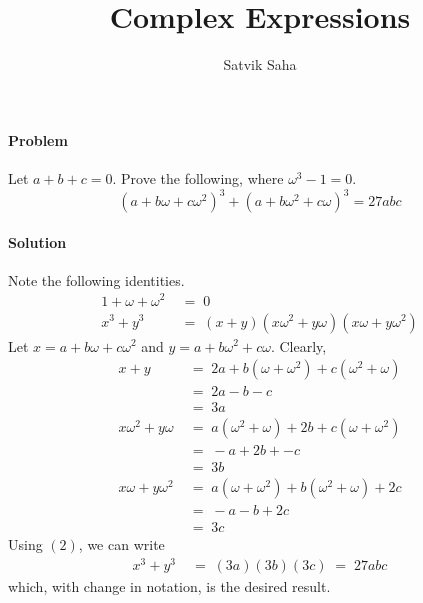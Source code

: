 \documentclass[a4paper, 11pt, reqno]{article}
\title{Complex Expressions}
\author{Satvik Saha}
\date{}
\begin{document}
	\maketitle
	\paragraph{Problem}
	Let $a + b + c = 0$. Prove the following, where $\omega^3 - 1 = 0$.
	\begin{equation*}
		(a + b\omega + c\omega ^2)^3 + (a + b\omega ^2 + c\omega)^3 = 27abc
	\end{equation*}
	\paragraph{Solution}
	Note the following identities.
	\begin{align}
		1 + \omega + \omega ^2  \; &= \; 0 	\\ 
		x^3 + y^3  \; &= \;  (x + y)(x\omega^2 + y\omega)(x\omega + y\omega^2) 
	\end{align}
	Let $x  =  a + b\omega + c\omega ^2$ and $y  =  a + b\omega ^2 + c\omega$.
	Clearly,
	\begin{align*}
		x + y \; &= \; 2a + b(\omega + \omega^2) + c (\omega^2 + \omega )	\\
			\; &= \;  2a - b - c 			\\
			\; &= \;  3a				\\
		x\omega^2 + y\omega  \; &= \; a(\omega^2 + \omega) + 2b + c(\omega + \omega^2) \\
			\; &= \;  - a + 2b + - c		\\
			\; &= \;  3b				\\
		x\omega + y\omega^2  \; &= \; a(\omega + \omega^2) + b(\omega ^2 + \omega) + 2c \\
			\; &= \;  - a - b + 2c			\\
			\; &= \;  3c				
	\end{align*}
	Using $(2)$, we can write
	\begin{align*}
		x^3 + y^3 \; &= \; (3a)(3b)(3c)  \; = \; 27abc  
	\end{align*}
	which, with change in notation, is the desired result.
\end{document}
